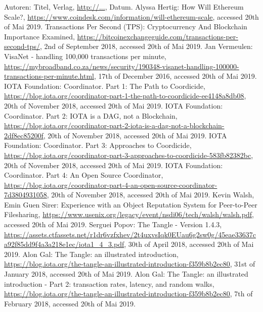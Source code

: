 \begin{thebibliography}{99}

 Autoren: Titel, Verlag, \url{http://...}, Datum.
 Alyssa Hertig: How Will Ethereum Scale?, \url{https://www.coindesk.com/information/will-ethereum-scale}, accessed 20th of Mai 2019.
 Transactions Per Second (TPS): Cryptocurrency And Blockchain Importance Examined, \url{https://bitcoinexchangeguide.com/transactions-per-second-tps/}, 2nd of September 2018, accessed 20th of Mai 2019.
 Jan Vermeulen: VisaNet - handling 100,000 transactions per minute, \url{https://mybroadband.co.za/news/security/190348-visanet-handling-100000-transactions-per-minute.html}, 17th of December 2016, accessed 20th of Mai 2019.
 IOTA Foundation: Coordinator. Part 1: The Path to Coordicide, \url{https://blog.iota.org/coordinator-part-1-the-path-to-coordicide-ee4148a8db08}, 20th of November 2018, accessed 20th of Mai 2019.
 IOTA Foundation: Coordinator. Part 2: IOTA is a DAG, not a Blockchain, \url{https://blog.iota.org/coordinator-part-2-iota-is-a-dag-not-a-blockchain-2df8ec85200f}, 20th of November 2018, accessed 20th of Mai 2019.
 IOTA Foundation: Coordinator. Part 3: Approaches to Coordicide, \url{https://blog.iota.org/coordinator-part-3-approaches-to-coordicide-583fb82382bc}, 20th of November 2018, accessed 20th of Mai 2019.
 IOTA Foundation: Coordinator. Part 4: An Open Source Coordinator, \url{https://blog.iota.org/coordinator-part-4-an-open-source-coordinator-7d3804931058}, 20th of November 2018, accessed 20th of Mai 2019.
 Kevin Walsh, Emin Guen Sirer: Experience with an Object Reputation System for Peer-to-Peer Filesharing, \url{https://www.usenix.org/legacy/event/nsdi06/tech/walsh/walsh.pdf}, accessed 20th of Mai 2019.
 Serguei Popov: The Tangle - Version 1.4.3, \url{https://assets.ctfassets.net/r1dr6vzfxhev/2t4uxvsIqk0EUau6g2sw0g/45eae33637ca92f85dd9f4a3a218e1ec/iota1_4_3.pdf}, 30th of April 2018, accessed 20th of Mai 2019.
 Alon Gal: The Tangle: an illustrated introduction, \url{https://blog.iota.org/the-tangle-an-illustrated-introduction-f359b8b2ec80}, 31st of January 2018, accessed 20th of Mai 2019.
 Alon Gal: The Tangle: an illustrated introduction - Part 2: transaction rates, latency, and random walks, \url{https://blog.iota.org/the-tangle-an-illustrated-introduction-f359b8b2ec80}, 7th of February 2018, accessed 20th of Mai 2019.

\end{thebibliography}
